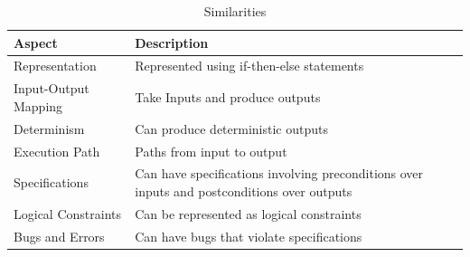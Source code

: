\documentclass[oneside,11pt,dvipsnames]{book}
\numberwithin{equation}{section}
\theoremstyle{definition}
\theoremstyle{remark}
\begin{document}
\begin{table}
    \caption{Similarities}\label{tab:nn-software-similarities}
    \scriptsize
    \centering
\begin{tabular}{l|l}
    \toprule
    Aspect & Description\\
    \midrule
    Representation &	Represented using if-then-else statements\\
    Input-Output Mapping &	Take Inputs and produce outputs\\
    Determinism	& Can produce deterministic outputs\\
    Execution Path	& Paths from input to output\\
    Specifications & Can have specifications involving preconditions over inputs and postconditions over outputs\\
    Logical Constraints	& Can be represented as logical constraints\\
    Bugs and Errors & Can have bugs that violate specifications\\
    \bottomrule
\end{tabular}    
\end{table}
\end{document}
